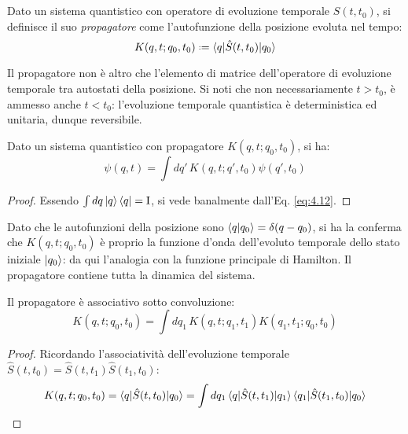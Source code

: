 \begin{definition}
	Dato un sistema quantistico con operatore di evoluzione temporale $ \hat{S}(t,t_0) $, si definisce il suo \textit{propagatore} come l'autofunzione della posizione evoluta nel tempo:
	\begin{equation}
		K(q,t ; q_0,t_0) \defeq \braket{q | \hat{S}(t,t_0) | q_0}
		\label{eq:4.13}
	\end{equation}
\end{definition}

Il propagatore non è altro che l'elemento di matrice dell'operatore di evoluzione temporale tra autostati della posizione. Si noti che non necessariamente $ t > t_0 $, è ammesso anche $ t < t_0 $: l'evoluzione temporale quantistica è deterministica ed unitaria, dunque reversibile.

\begin{proposition}
	Dato un sistema quantistico con propagatore $ K(q,t ; q_0,t_0) $, si ha:
	\begin{equation}
		\psi(q,t) = \int dq'\, K(q,t ; q',t_0) \psi(q',t_0)
		\label{eq:4.14}
	\end{equation}
\end{proposition}
\begin{proof}
	Essendo $ \int dq \ket{q}\bra{q} = \mathrm{I} $, si vede banalmente dall'Eq. \ref{eq:4.12}.
\end{proof}

Dato che le autofunzioni della posizione sono $ \braket{q | q_0} = \delta(q - q_0) $, si ha la conferma che $ K(q,t ; q_0,t_0) $ è proprio la funzione d'onda dell'evoluto temporale dello stato iniziale $ \ket{q_0} $: da qui l'analogia con la funzione principale di Hamilton. Il propagatore contiene tutta la dinamica del sistema.

\begin{proposition}\label{prop-ass-conv}
	Il propagatore è associativo sotto convoluzione:
	\begin{equation}
		K(q,t ; q_0,t_0) = \int dq_1\, K(q,t ; q_1,t_1) K(q_1,t_1 ; q_0,t_0)
		\label{eq:4.15}
	\end{equation}
\end{proposition}
\begin{proof}
	Ricordando l'associatività dell'evoluzione temporale $ \hat{S}(t,t_0) = \hat{S}(t,t_1) \hat{S}(t_1,t_0) $:
	\begin{equation*}
		K(q,t ; q_0,t_0) = \braket{q | \hat{S}(t,t_0) | q_0} = \int dq_1 \braket{q | \hat{S}(t,t_1) | q_1} \braket{q_1 | \hat{S}(t_1,t_0) | q_0}
	\end{equation*}
\end{proof}

